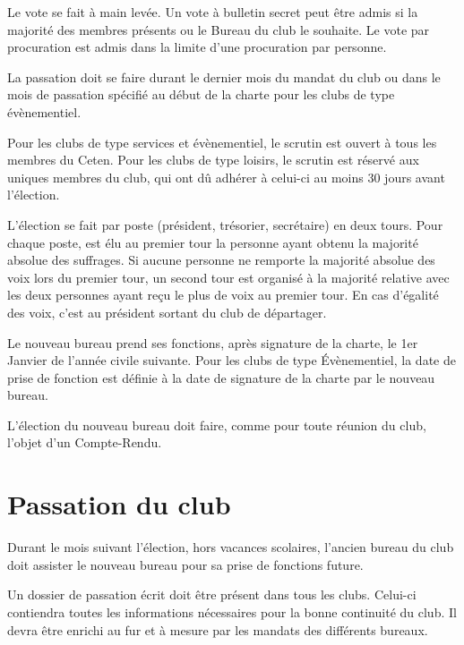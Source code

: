 \documentclass{article}
\begin{document}
\begin{multicols}{2}
{			Le vote se fait à main levée. Un vote à bulletin secret peut
			être admis si la majorité des membres présents ou le Bureau
			du club le souhaite. Le vote par procuration est admis dans
			la limite d’une procuration par personne.

			La passation doit se faire durant le dernier mois du mandat
			du club ou dans le mois de passation spécifié au début de la
			charte pour les clubs de type évènementiel.

			Pour les clubs de type services et évènementiel, le scrutin
			est ouvert à tous les membres du Ceten. Pour les clubs de
			type loisirs, le scrutin est réservé aux uniques membres du
			club, qui ont dû adhérer à celui-ci au moins 30 jours avant
			l’élection.

			L’élection se fait par poste (président, trésorier, secrétaire)
			en deux tours. Pour chaque poste, est élu au premier tour la
			personne ayant obtenu la majorité absolue des suffrages. Si
			aucune personne ne remporte la majorité absolue des voix
			lors du premier tour, un second tour est organisé à la
			majorité relative avec les deux personnes ayant reçu le plus
			de voix au premier tour. En cas d’égalité des voix, c’est au
			président sortant du club de départager.

			Le nouveau bureau prend ses fonctions, après signature de
			la charte, le 1er Janvier de l’année civile suivante. Pour les
			clubs de type Évènementiel, la date de prise de fonction est
			définie à la date de signature de la charte par le nouveau
			bureau.

			L’élection du nouveau bureau doit faire, comme pour toute
			réunion du club, l’objet d’un Compte-Rendu.

		}
		
		\section{Passation du club}

		{\small

			Durant le mois suivant l’élection, hors vacances scolaires,
			l’ancien bureau du club doit assister le nouveau bureau pour
			sa prise de fonctions future.

			Un dossier de passation écrit doit être présent dans tous les
			clubs. Celui-ci contiendra toutes les informations
			nécessaires pour la bonne continuité du club. Il devra être
			enrichi au fur et à mesure par les mandats des différents
			bureaux.

}
\end{multicols}
\end{document}
